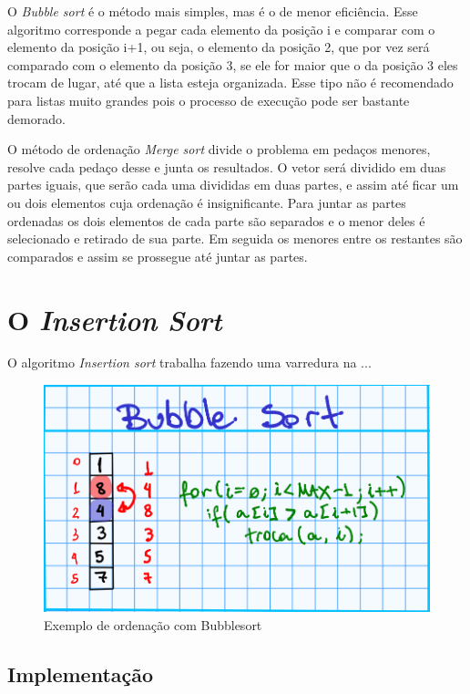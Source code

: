 \documentclass[a4paper,10pt]{article} %
\begin{document}
    O \textit{Bubble sort} é o método mais simples, mas é o de menor eficiência. Esse algoritmo corresponde a pegar cada elemento da posição i e comparar com o elemento da posição i+1, ou seja, o elemento da posição 2, que por vez será comparado com o elemento da posição 3, se ele for maior que o da posição 3 eles trocam de lugar, até que a lista esteja organizada. Esse tipo não é recomendado para listas muito grandes pois o processo de execução pode ser bastante demorado.
    
    O método de ordenação \textit{Merge sort} divide o problema em pedaços menores, resolve cada pedaço desse e junta os resultados. O vetor será dividido em duas partes iguais, que serão cada uma divididas em duas partes, e assim até ficar um ou dois elementos cuja ordenação é insignificante. Para juntar as partes ordenadas os dois elementos de cada parte são separados e o menor deles é selecionado e retirado de sua parte. Em seguida os menores entre os restantes são comparados e assim se prossegue até juntar as partes.


\section{O \textit{Insertion Sort}}

O algoritmo \emph{Insertion sort} trabalha fazendo uma varredura na ...

\begin{figure}[ht]
\centering
\includegraphics[width=.80\linewidth]{bubble.png}
\caption{Exemplo de ordenação com Bubblesort}
\label{fig:xsort}
\end{figure}


\subsection{Implementação}
\end{document}
